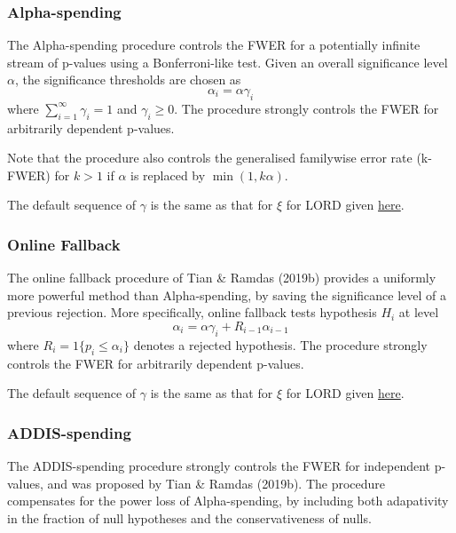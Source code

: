 \documentclass[
]{article}
\begin{document}
\hypertarget{Alpha-spending}{%
\subsubsection{Alpha-spending}\label{Alpha-spending}}

The Alpha-spending procedure controls the FWER for a potentially
infinite stream of p-values using a Bonferroni-like test. Given an
overall significance level \(\alpha\), the significance thresholds are
chosen as \[\alpha_i = \alpha \gamma_i\] where
\(\sum_{i=1}^{\infty} \gamma_i = 1\) and \(\gamma_i \geq 0\). The
procedure strongly controls the FWER for arbitrarily dependent p-values.

Note that the procedure also controls the generalised familywise error
rate (k-FWER) for \(k > 1\) if \(\alpha\) is replaced by
\(\min(1,k\alpha)\).

The default sequence of \(\gamma\) is the same as that for \(\xi\) for
LORD given \protect\hyperlink{LORD_gamma}{here}.

\hypertarget{onlineFallback}{%
\subsubsection{Online Fallback}\label{onlineFallback}}

The online fallback procedure of Tian \& Ramdas (2019b) provides a
uniformly more powerful method than Alpha-spending, by saving the
significance level of a previous rejection. More specifically, online
fallback tests hypothesis \(H_i\) at level
\[\alpha_i = \alpha \gamma_i + R_{i-1} \alpha_{i-1}\] where
\(R_i = 1\{p_i \leq \alpha_i\}\) denotes a rejected hypothesis. The
procedure strongly controls the FWER for arbitrarily dependent p-values.

The default sequence of \(\gamma\) is the same as that for \(\xi\) for
LORD given \protect\hyperlink{LORD_gamma}{here}.

\hypertarget{ADDIS-spending}{%
\subsubsection{ADDIS-spending}\label{ADDIS-spending}}

The ADDIS-spending procedure strongly controls the FWER for independent
p-values, and was proposed by Tian \& Ramdas (2019b). The procedure
compensates for the power loss of Alpha-spending, by including both
adapativity in the fraction of null hypotheses and the conservativeness
of nulls.
\end{document}
